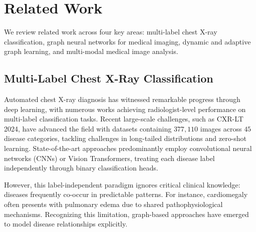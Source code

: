 \documentclass[
  journal=noname,
  manuscript=draft,
  year=,
  volume=,
]{cup-journal}
\begin{document}

\section{Related Work}
\label{sec:related}

We review related work across four key areas: multi-label chest X-ray 
classification, graph neural networks for medical imaging, dynamic and 
adaptive graph learning, and multi-modal medical image analysis. 

\subsection{Multi-Label Chest X-Ray Classification}
\label{subsec:cxr_classification}

Automated chest X-ray diagnosis has witnessed remarkable progress 
through deep learning, with numerous works achieving radiologist-level 
performance on multi-label classification tasks. Recent large-scale 
challenges, such as CXR-LT 2024\autocite{LIN2025103739}, have advanced the 
field with datasets containing $377,110$ images across $45$ disease 
categories, tackling challenges in long-tailed distributions and 
zero-shot learning. State-of-the-art approaches predominantly employ 
convolutional neural networks (CNNs)\autocite{huang2018denselyconnectedconvolutionalnetworks}
or Vision Transformers\autocite{dosovitskiy2021imageworth16x16words}, 
treating each disease label independently through binary classification 
heads.

However, this label-independent paradigm ignores critical clinical 
knowledge: diseases frequently co-occur in predictable patterns. For 
instance, cardiomegaly often presents with pulmonary edema due to 
shared pathophysiological mechanisms. Recognizing this limitation, 
graph-based approaches have emerged to model disease relationships 
explicitly.
\end{document}
